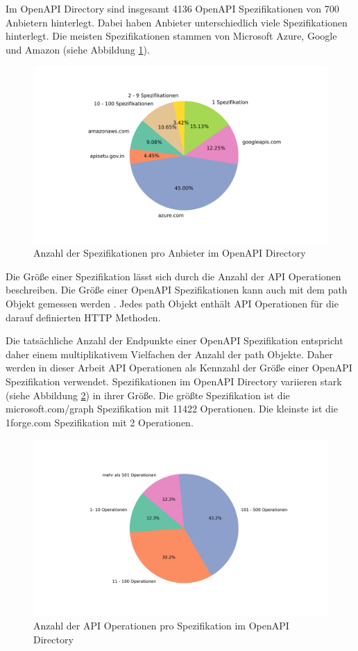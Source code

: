 Im OpenAPI Directory sind insgesamt 4136 OpenAPI Spezifikationen von 700 Anbietern hinterlegt. Dabei  haben Anbieter unterschiedlich viele Spezifikationen hinterlegt. Die meisten Spezifikationen stammen von Microsoft Azure, Google und Amazon (siehe Abbildung \ref{fig:Specifications}).
\begin{figure}[htbp]
  \centering
  \includegraphics[width=0.9\linewidth]{img/specificationsperdomainpie.png}
  \caption{Anzahl der Spezifikationen pro Anbieter im OpenAPI Directory}
  \label{fig:Specifications}
\end{figure}

\newpage
Die Größe einer Spezifikation lässt sich durch die Anzahl der \acs{API} Operationen beschreiben. Die Größe einer OpenAPI Spezifikationen kann auch mit dem path Objekt gemessen werden \parencite{bogner_restruler_2024}. Jedes path Objekt enthält API Operationen für die darauf definierten \acs{HTTP} Methoden. 

Die tatsächliche Anzahl der Endpunkte einer OpenAPI Spezifikation entspricht daher einem multiplikativem Vielfachen der Anzahl der path Objekte. Daher werden in dieser Arbeit API Operationen als Kennzahl der Größe einer OpenAPI Spezifikation verwendet.
Spezifikationen im OpenAPI Directory variieren stark (siehe Abbildung \ref{fig:Operations}) in ihrer Größe. Die größte Spezifikation ist die microsoft.com/graph Spezifikation mit 11422 Operationen. Die kleinste ist die 1forge.com Spezifikation mit 2 Operationen.
\begin{figure}[htbp]
  \centering
  \includegraphics[width=0.9\linewidth]{img/operationsperspecificationpie.png}
  \caption{Anzahl der API Operationen pro Spezifikation im OpenAPI Directory}
  \label{fig:Operations}
\end{figure}


